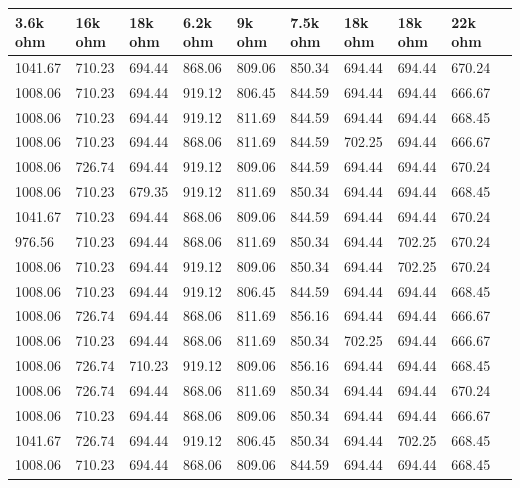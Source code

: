 \begin{longtable}{|l|l|l|l|l|l|l|l|l|l|}
		\hline
		3.6k ohm & 16k ohm & 18k ohm & 6.2k ohm & 9k ohm & 7.5k ohm & 18k ohm & 18k ohm & 22k ohm \\ \hline
		1041.67  & 710.23  & 694.44  & 868.06   & 809.06 & 850.34   & 694.44  & 694.44  & 670.24  \\ \hline
		1008.06  & 710.23  & 694.44  & 919.12   & 806.45 & 844.59   & 694.44  & 694.44  & 666.67  \\ \hline
		1008.06  & 710.23  & 694.44  & 919.12   & 811.69 & 844.59   & 694.44  & 694.44  & 668.45  \\ \hline
		1008.06  & 710.23  & 694.44  & 868.06   & 811.69 & 844.59   & 702.25  & 694.44  & 666.67  \\ \hline
		1008.06  & 726.74  & 694.44  & 919.12   & 809.06 & 844.59   & 694.44  & 694.44  & 670.24  \\ \hline
		1008.06  & 710.23  & 679.35  & 919.12   & 811.69 & 850.34   & 694.44  & 694.44  & 668.45  \\ \hline
		1041.67  & 710.23  & 694.44  & 868.06   & 809.06 & 844.59   & 694.44  & 694.44  & 670.24  \\ \hline
		976.56   & 710.23  & 694.44  & 868.06   & 811.69 & 850.34   & 694.44  & 702.25  & 670.24  \\ \hline
		1008.06  & 710.23  & 694.44  & 919.12   & 809.06 & 850.34   & 694.44  & 702.25  & 670.24  \\ \hline
		1008.06  & 710.23  & 694.44  & 919.12   & 806.45 & 844.59   & 694.44  & 694.44  & 668.45  \\ \hline
		1008.06  & 726.74  & 694.44  & 868.06   & 811.69 & 856.16   & 694.44  & 694.44  & 666.67  \\ \hline
		1008.06  & 710.23  & 694.44  & 868.06   & 811.69 & 850.34   & 702.25  & 694.44  & 666.67  \\ \hline
		1008.06  & 726.74  & 710.23  & 919.12   & 809.06 & 856.16   & 694.44  & 694.44  & 668.45  \\ \hline
		1008.06  & 726.74  & 694.44  & 868.06   & 811.69 & 850.34   & 694.44  & 694.44  & 670.24  \\ \hline
		1008.06  & 710.23  & 694.44  & 868.06   & 809.06 & 850.34   & 694.44  & 694.44  & 666.67  \\ \hline
		1041.67  & 726.74  & 694.44  & 919.12   & 806.45 & 850.34   & 694.44  & 702.25  & 668.45  \\ \hline
		1008.06  & 710.23  & 694.44  & 868.06   & 809.06 & 844.59   & 694.44  & 694.44  & 668.45  \\ \hline

\end{longtable}
